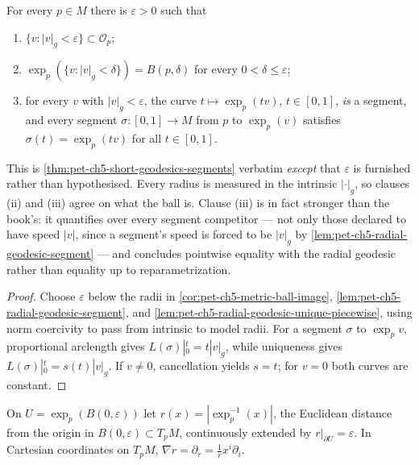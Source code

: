 \begin{lemma}
  \label{lem:pet-ch5-short-geodesics-segments-normal}


  For every $p\in M$ there is $\varepsilon>0$ such that
  \begin{enumerate}
    \item $\{v:|v|_g<\varepsilon\}\subset\mathcal O_p$;
    \item $\exp_p(\{v:|v|_g<\delta\})=B(p,\delta)$ for every $0<\delta\le\varepsilon$;
    \item for every $v$ with $|v|_g<\varepsilon$, the curve $t\mapsto\exp_p(tv)$,
      $t\in[0,1]$, \emph{is} a segment, and every segment $\sigma:[0,1]\to M$ from
      $p$ to $\exp_p(v)$ satisfies $\sigma(t)=\exp_p(tv)$ for all $t\in[0,1]$.
  \end{enumerate}
  This is \cref{thm:pet-ch5-short-geodesics-segments} verbatim \emph{except} that
  $\varepsilon$ is furnished rather than hypothesised.  Every radius is measured in
  the intrinsic $|\cdot|_g$, so clauses (ii) and (iii) agree on what the ball is.
  Clause (iii) is in fact stronger than the book's: it quantifies over every
  segment competitor — not only those declared to have speed $|v|$, since a
  segment's speed is forced to be $|v|_g$ by
  \cref{lem:pet-ch5-radial-geodesic-segment} — and concludes pointwise equality
  with the radial geodesic rather than equality up to reparametrization.
\end{lemma}
\begin{proof}

  \sketch
  Choose $\varepsilon$ below the radii in
  \cref{cor:pet-ch5-metric-ball-image},
  \cref{lem:pet-ch5-radial-geodesic-segment}, and
  \cref{lem:pet-ch5-radial-geodesic-unique-piecewise}, using norm coercivity to
  pass from intrinsic to model radii.  For a segment $\sigma$ to $\exp_pv$,
  proportional arclength gives $L(\sigma)|_0^t=t|v|_g$, while uniqueness gives
  $L(\sigma)|_0^t=s(t)|v|_g$.  If $v\ne0$, cancellation yields $s=t$; for $v=0$
  both curves are constant.
\end{proof}

\begin{definition}
  \label{def:pet-ch5-radial-distance-function}


  On $U=\exp_p(B(0,\varepsilon))$ let $r(x)=|\exp_p^{-1}(x)|$, the Euclidean
  distance from the origin in $B(0,\varepsilon)\subset T_pM$, continuously extended
  by $r|_{\partial U}=\varepsilon$. In Cartesian coordinates on $T_pM$,
  $\nabla r=\partial_r=\tfrac1rx^i\partial_i$.
\end{definition}

